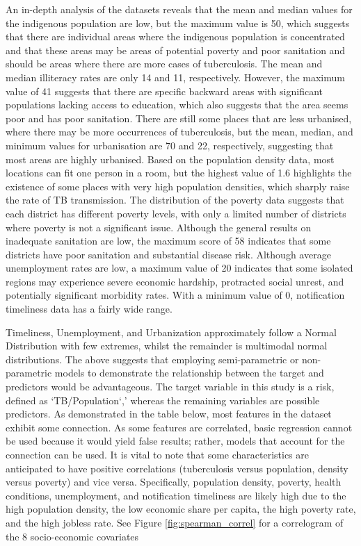 An in-depth analysis of the datasets reveals that the mean and median values for the indigenous population are low, but the maximum value is 50, which suggests that there are individual areas where the indigenous population is concentrated and that these areas may be areas of potential poverty and poor sanitation and should be areas where there are more cases of tuberculosis. The mean and median illiteracy rates are only 14 and 11, respectively. However, the maximum value of 41 suggests that there are specific backward areas with significant populations lacking access to education, which also suggests that the area seems poor and has poor sanitation. There are still some places that are less urbanised, where there may be more occurrences of tuberculosis, but the mean, median, and minimum values for urbanisation are 70 and 22, respectively, suggesting that most areas are highly urbanised. Based on the population density data, most locations can fit one person in a room, but the highest value of 1.6 highlights the existence of some places with very high population densities, which sharply raise the rate of TB transmission. The distribution of the poverty data suggests that each district has different poverty levels, with only a limited number of districts where poverty is not a significant issue. Although the general results on inadequate sanitation are low, the maximum score of 58 indicates that some districts have poor sanitation and substantial disease risk. Although average unemployment rates are low, a maximum value of 20 indicates that some isolated regions may experience severe economic hardship, protracted social unrest, and potentially significant morbidity rates. With a minimum value of 0, notification timeliness data has a fairly wide range.

Timeliness, Unemployment, and Urbanization approximately follow a Normal Distribution with few extremes, whilst the remainder is multimodal normal distributions. The above suggests that employing semi-parametric or non-parametric models to demonstrate the relationship between the target and predictors would be advantageous. The target variable in this study is a risk, defined as `TB/Population`,' whereas the remaining variables are possible predictors. As demonstrated in the table below, most features in the dataset exhibit some connection. As some features are correlated, basic regression cannot be used because it would yield false results; rather, models that account for the connection can be used. It is vital to note that some characteristics are anticipated to have positive correlations (tuberculosis versus population, density versus poverty) and vice versa. Specifically, population density, poverty, health conditions, unemployment, and notification timeliness are likely high due to the high population density, the low economic share per capita, the high poverty rate, and the high jobless rate. See Figure \ref{fig:spearman_correl} for a correlogram of the 8 socio-economic covariates


